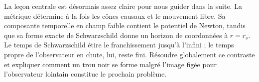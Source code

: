 La leçon centrale est désormais assez claire pour nous guider dans la suite. La métrique détermine à la fois les cônes causaux et le mouvement libre. Sa composante temporelle en champ faible contient le potentiel de Newton, tandis que sa forme exacte de Schwarzschild donne un horizon de coordonnées à \(r=r_s\). Le temps de Schwarzschild étire le franchissement jusqu’à l’infini ; le temps propre de l’observateur en chute, lui, reste fini. Résoudre globalement ce contraste et expliquer comment un trou noir se forme malgré l’image figée pour l’observateur lointain constitue le prochain problème.